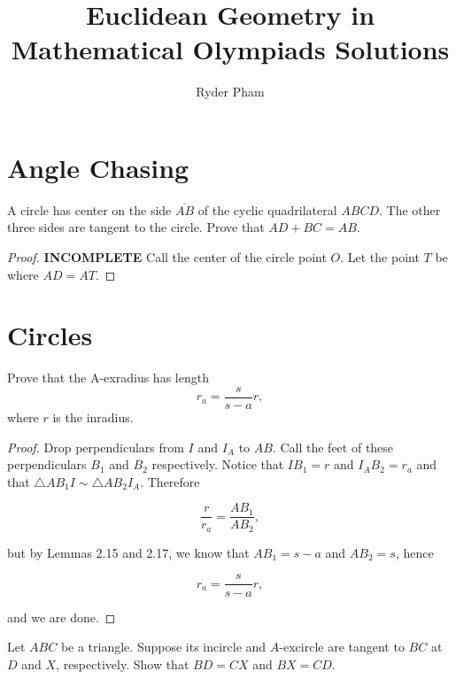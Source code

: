 \documentclass[letterpaper,oneside]{scrartcl}
\providecommand{\ol}{\overline}
\begin{document}
\title{Euclidean Geometry in Mathematical Olympiads Solutions}
\author{Ryder Pham}
\maketitle

\section{Angle Chasing}
\begin{problem*}
  [1.51, IMO 1985/1]
  A circle has center on the side $\ol{AB}$ of the cyclic quadrilateral $ABCD$. The other three sides are tangent to the circle. Prove that $AD + BC = AB$.
\end{problem*}

\begin{proof}
  \textbf{INCOMPLETE} Call the center of the circle point $O.$ Let the point $T$ be where $AD = AT.$
\end{proof}
\newpage
\section{Circles}

\begin{lemma*}
  [2.19]
  Prove that the A-exradius has length
  $$r_a = \frac{s}{s-a}r,$$
  where $r$ is the inradius.
\end{lemma*}

\begin{proof}
  Drop perpendiculars from $I$ and $I_A$ to $AB$. Call the feet of these perpendiculars $B_1$ and $B_2$ respectively. Notice that $IB_1 = r$ and $I_AB_2 = r_a$ and that $\triangle AB_1I \sim \triangle AB_2I_A$. Therefore

  $$\frac{r}{r_a} = \frac{AB_1}{AB_2},$$

  but by Lemmas 2.15 and 2.17, we know that $AB_1 = s-a$ and $AB_2 = s$, hence

  $$r_a = \frac{s}{s-a}r,$$

  and we are done.
\end{proof}

\begin{lemma*}
  [2.20]
  Let $ABC$ be a triangle. Suppose its incircle and $A$-excircle are tangent to $BC$ at $D$ and $X$, respectively. Show that $BD = CX$ and $BX = CD$.
\end{lemma*}
\end{document}
